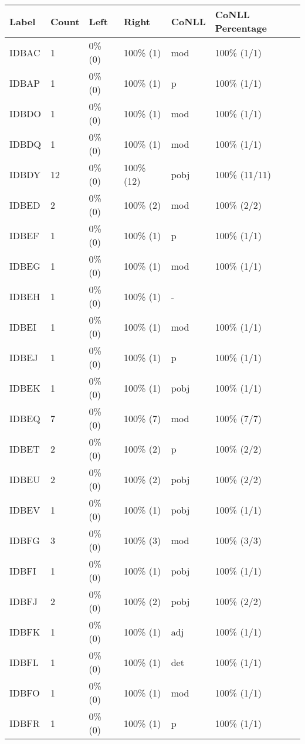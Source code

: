 \begin{figure*}
\begin{tabular}{|l|l|l|l||l|l|}
\hline
Label & Count & Left & Right & CoNLL & CoNLL Percentage\\ 
\hline
 IDBAC & 1 & 0\% (0) & 100\% (1) & mod & 100\% (1/1) \\ 
\hline
 IDBAP & 1 & 0\% (0) & 100\% (1) & p & 100\% (1/1) \\ 
\hline
 IDBDO & 1 & 0\% (0) & 100\% (1) & mod & 100\% (1/1) \\ 
\hline
 IDBDQ & 1 & 0\% (0) & 100\% (1) & mod & 100\% (1/1) \\ 
\hline
 IDBDY & 12 & 0\% (0) & 100\% (12) & pobj & 100\% (11/11) \\ 
\hline
 IDBED & 2 & 0\% (0) & 100\% (2) & mod & 100\% (2/2) \\ 
\hline
 IDBEF & 1 & 0\% (0) & 100\% (1) & p & 100\% (1/1) \\ 
\hline
 IDBEG & 1 & 0\% (0) & 100\% (1) & mod & 100\% (1/1) \\ 
\hline
 IDBEH & 1 & 0\% (0) & 100\% (1) & - &  \\ 
\hline
 IDBEI & 1 & 0\% (0) & 100\% (1) & mod & 100\% (1/1) \\ 
\hline
 IDBEJ & 1 & 0\% (0) & 100\% (1) & p & 100\% (1/1) \\ 
\hline
 IDBEK & 1 & 0\% (0) & 100\% (1) & pobj & 100\% (1/1) \\ 
\hline
 IDBEQ & 7 & 0\% (0) & 100\% (7) & mod & 100\% (7/7) \\ 
\hline
 IDBET & 2 & 0\% (0) & 100\% (2) & p & 100\% (2/2) \\ 
\hline
 IDBEU & 2 & 0\% (0) & 100\% (2) & pobj & 100\% (2/2) \\ 
\hline
 IDBEV & 1 & 0\% (0) & 100\% (1) & pobj & 100\% (1/1) \\ 
\hline
 IDBFG & 3 & 0\% (0) & 100\% (3) & mod & 100\% (3/3) \\ 
\hline
 IDBFI & 1 & 0\% (0) & 100\% (1) & pobj & 100\% (1/1) \\ 
\hline
 IDBFJ & 2 & 0\% (0) & 100\% (2) & pobj & 100\% (2/2) \\ 
\hline
 IDBFK & 1 & 0\% (0) & 100\% (1) & adj & 100\% (1/1) \\ 
\hline
 IDBFL & 1 & 0\% (0) & 100\% (1) & det & 100\% (1/1) \\ 
\hline
 IDBFO & 1 & 0\% (0) & 100\% (1) & mod & 100\% (1/1) \\ 
\hline
 IDBFR & 1 & 0\% (0) & 100\% (1) & p & 100\% (1/1) \\ 

\end{tabular}
\end{figure*}

